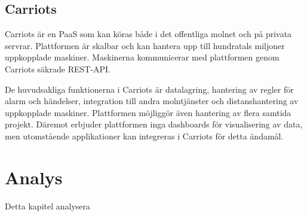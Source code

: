 \subsection{Carriots}
Carriots är en PaaS som kan köras både i det offentliga molnet och på privata
servrar. Plattformen är skalbar och kan hantera upp till
hundratals miljoner uppkopplade maskiner. Maskinerna kommunicerar med
plattformen genom Carriots säkrade REST-API.\cite{carriots}

De huvudsakliga funktionerna i Carriots är datalagring, hantering av
regler för alarm och händelser, integration till andra molntjänster och
distanshantering av uppkopplade maskiner. Plattformen möjliggör även hantering
av flera samtida projekt. Däremot erbjuder plattformen inga 
dashboards för visualisering av data, men utomstående applikationer kan 
integreras i Carriots för detta ändamål.\cite{carriots}


\pagebreak
\section{Analys}
\label{sec:esimluku}

Detta kapitel analysera

